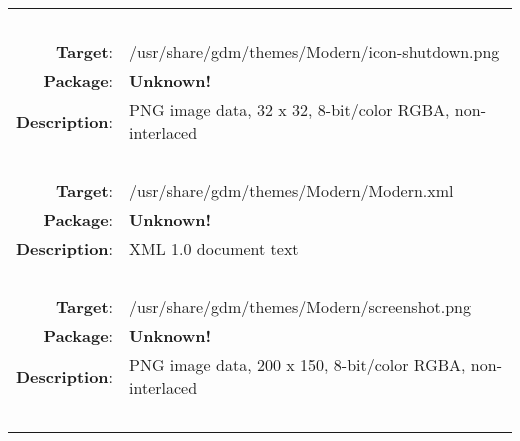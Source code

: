 \begin{longtable}{rl}
\multicolumn{2}{l}{\ }\\
\textbf{Target}: & /usr/share/gdm/themes/Modern/icon-shutdown.png\\
\textbf{Package}: & \textbf{Unknown!}\\
\textbf{Description}: & PNG image data, 32 x 32, 8-bit/color RGBA, non-interlaced\\
\multicolumn{2}{l}{\ }\\
\textbf{Target}: & /usr/share/gdm/themes/Modern/Modern.xml\\
\textbf{Package}: & \textbf{Unknown!}\\
\textbf{Description}: & XML 1.0 document text\\
\multicolumn{2}{l}{\ }\\
\textbf{Target}: & /usr/share/gdm/themes/Modern/screenshot.png\\
\textbf{Package}: & \textbf{Unknown!}\\
\textbf{Description}: & PNG image data, 200 x 150, 8-bit/color RGBA, non-interlaced\\
\multicolumn{2}{l}{\ }\\
\hline
\end{longtable}

